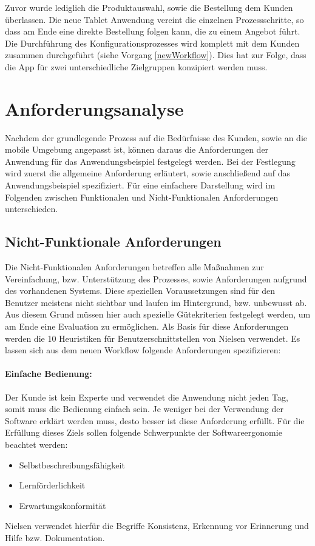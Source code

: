 Zuvor wurde lediglich die Produktauswahl, sowie die Bestellung dem Kunden überlassen. Die neue Tablet Anwendung vereint die einzelnen Prozessschritte, so dass am Ende eine direkte Bestellung folgen kann, die zu einem Angebot führt. Die Durchführung des Konfigurationsprozesses wird  komplett mit dem Kunden zusammen durchgeführt (siehe Vorgang \ref{newWorkflow}). Dies hat zur Folge, dass die App für zwei unterschiedliche Zielgruppen konzipiert werden muss.


\section{Anforderungsanalyse} \label{requirements}
Nachdem der grundlegende Prozess auf die Bedürfnisse des Kunden, sowie an die mobile Umgebung angepasst ist, können daraus die Anforderungen der Anwendung für das Anwendungsbeispiel festgelegt werden. Bei der Festlegung wird zuerst die allgemeine Anforderung erläutert, sowie anschließend auf das Anwendungsbeispiel spezifiziert. Für eine einfachere Darstellung wird im Folgenden zwischen Funktionalen und Nicht-Funktionalen Anforderungen unterschieden. 

\subsection{Nicht-Funktionale Anforderungen}\label{non_functional_requirements}
Die Nicht-Funktionalen Anforderungen betreffen alle Maßnahmen zur Vereinfachung, bzw. Unterstützung des Prozesses, sowie Anforderungen aufgrund des vorhandenen Systems. Diese speziellen Voraussetzungen sind für den Benutzer meistens nicht sichtbar und laufen im Hintergrund, bzw. unbewusst ab. Aus diesem Grund müssen hier auch spezielle Gütekriterien festgelegt werden, um am Ende eine Evaluation zu ermöglichen. Als Basis für diese Anforderungen werden die 10 Heuristiken für Benutzerschnittstellen von Nielsen \cite{bib:heuristicsNielsen} verwendet.
Es lassen sich aus dem neuen Workflow folgende Anforderungen spezifizieren:


\paragraph{Einfache Bedienung:} Der Kunde ist kein Experte und verwendet die Anwendung nicht jeden Tag, somit muss die Bedienung einfach sein. Je weniger bei der Verwendung der Software erklärt werden muss, desto besser ist diese Anforderung erfüllt. Für die Erfüllung dieses Ziels sollen folgende Schwerpunkte der Softwareergonomie \cite{bib:softwareErgonomie} beachtet werden: 
\begin{itemize}
        \item Selbstbeschreibungsfähigkeit
        \item Lernförderlichkeit
        \item Erwartungskonformität
\end{itemize}
Nielsen verwendet hierfür die Begriffe Konsistenz, Erkennung vor Erinnerung und Hilfe bzw. Dokumentation.

